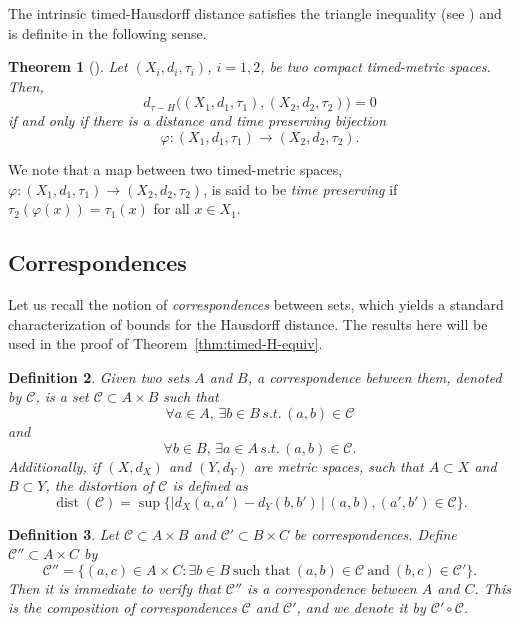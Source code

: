 \documentclass[a4paper,12pt,reqno]{amsart}
\theoremstyle{plain}
\newtheorem{thm}{Theorem}[section]
\newtheorem{defn}[thm]{Definition}
\newcommand{\be}{\begin{equation}}
\newcommand{\ee}{\end{equation}}
\newcommand{\dist}{\operatorname{dist}}
\begin{document}
The intrinsic timed-Hausdorff 
distance satisfies the triangle inequality (see \cite[Proposition~4.4]{Che-Perales-Sormani-2025}) and is definite in the following sense. 

\begin{thm}[{\cite[Theorem 5.14]{SakSor-Notions}}]
\label{thm:definite-timed-H}
Let
$(X_i, d_i, \tau_i)$, $i=1,2$, be 
two compact timed-metric spaces.
Then, 
\be \label{eq:tau-K-definite-1}
d_{\tau-H}\Big((X_1,d_1,\tau_1),(X_2,d_2,\tau_2)\Big)=0
\ee
if and only if there is a 
distance and time preserving bijection
\be\label{eq:tau-K-definite-2}
\varphi: (X_1,d_1,\tau_1) \to (X_2,d_2,\tau_2).
\ee
\end{thm}

We note that a map between two timed-metric spaces, $\varphi: (X_1,d_1,\tau_1) \to (X_2,d_2,\tau_2)$, is said to be
\textit{time preserving} if $\tau_2(\varphi(x))=\tau_1(x)$ for all $x\in X_1$.





\subsection{Correspondences}


Let us recall the notion of \textit{correspondences} between sets, which yields a standard characterization of bounds for the Hausdorff distance. The results here will be used in the proof of Theorem~\ref{thm:timed-H-equiv}.


\begin{defn}\label{defn:Corr}
Given two sets $A$ and $B$, 
a correspondence between them, denoted by $\mathcal{C}$, is a set $\mathcal{C} \subset A \times B$ such that 
\[
\forall a\in A,\,
\exists b\in B \, s.t. \,
 (a,b)\in {\mathcal C}
\]
and
\[
\forall b\in B,\,
\exists a\in A \, s.t. \,
(a,b)\in {\mathcal C}.
\]
Additionally, if $(X,d_X)$ and $(Y,d_Y)$ are metric spaces, such that 
$A \subset X$ and $B \subset Y$, the distortion of 
$\mathcal{C}$ is defined as 
\[
\dist(\mathcal C)= \sup \{|d_X(a,a') - d_Y(b,b') \, | \, (a,b), (a',b') \in \mathcal C \}.
\]
\end{defn}



\begin{defn}\label{defn:composition of correspondences}
Let $\mathcal{C}\subset A\times B$ and $\mathcal{C}'\subset B\times C$ be correspondences. Define $\mathcal{C}''\subset A\times C$ by
\[
\mathcal{C}'' = \{(a,c)\in A\times C: \exists b\in B\ \text{such that}\ (a,b)\in\mathcal{C}\ \text{and}\ (b,c)\in \mathcal{C}'\}.
\]
Then it is immediate to verify that $\mathcal{C}''$ is a correspondence between $A$ and $C$. This is the \textit{composition} of correspondences $\mathcal{C}$ and $\mathcal{C}'$, and we denote it by $\mathcal{C}'\circ \mathcal{C}$. 
\end{defn}
\end{document}
